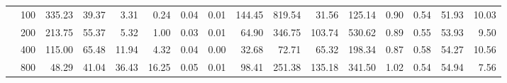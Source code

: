 \begin{table}[htbp]
\begin{tabular}{llrrrrrrrrrrrrrr}
 & 100 & 335.23 & 39.37 & 3.31 & 0.24 & 0.04 & 0.01 & 144.45 & 819.54 & 31.56 & 125.14 & 0.90 & 0.54 & 51.93 & 10.03 \\
 & 200 & 213.75 & 55.37 & 5.32 & 1.00 & 0.03 & 0.01 & 64.90 & 346.75 & 103.74 & 530.62 & 0.89 & 0.55 & 53.93 & 9.50 \\
 & 400 & 115.00 & 65.48 & 11.94 & 4.32 & 0.04 & 0.00 & 32.68 & 72.71 & 65.32 & 198.34 & 0.87 & 0.58 & 54.27 & 10.56 \\
 & 800 & 48.29 & 41.04 & 36.43 & 16.25 & 0.05 & 0.01 & 98.41 & 251.38 & 135.18 & 341.50 & 1.02 & 0.54 & 54.94 & 7.56 \\
\cline{1-16}
\bottomrule
\end{tabular}
\end{table}
